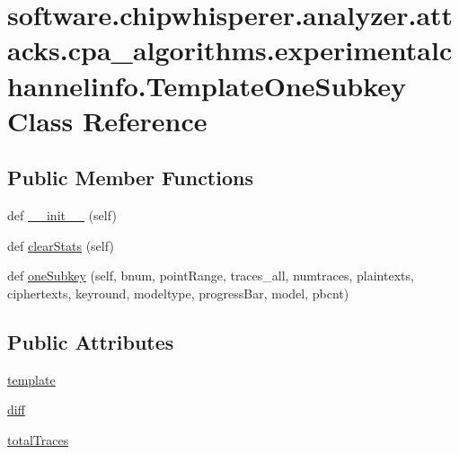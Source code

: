 \hypertarget{classsoftware_1_1chipwhisperer_1_1analyzer_1_1attacks_1_1cpa__algorithms_1_1experimentalchannelinfo_1_1TemplateOneSubkey}{}\section{software.\+chipwhisperer.\+analyzer.\+attacks.\+cpa\+\_\+algorithms.\+experimentalchannelinfo.\+Template\+One\+Subkey Class Reference}
\label{classsoftware_1_1chipwhisperer_1_1analyzer_1_1attacks_1_1cpa__algorithms_1_1experimentalchannelinfo_1_1TemplateOneSubkey}
\subsection*{Public Member Functions}
\begin{DoxyCompactItemize}
\item 
def \hyperlink{classsoftware_1_1chipwhisperer_1_1analyzer_1_1attacks_1_1cpa__algorithms_1_1experimentalchannelinfo_1_1TemplateOneSubkey_a4c291e571b9d3e10c2471c584ebc11d4}{\+\_\+\+\_\+init\+\_\+\+\_\+} (self)
\item 
def \hyperlink{classsoftware_1_1chipwhisperer_1_1analyzer_1_1attacks_1_1cpa__algorithms_1_1experimentalchannelinfo_1_1TemplateOneSubkey_aac361e887f569f9760129d82a70cbea1}{clear\+Stats} (self)
\item 
def \hyperlink{classsoftware_1_1chipwhisperer_1_1analyzer_1_1attacks_1_1cpa__algorithms_1_1experimentalchannelinfo_1_1TemplateOneSubkey_a7277d55c322897cd3b9739b27e4ee30b}{one\+Subkey} (self, bnum, point\+Range, traces\+\_\+all, numtraces, plaintexts, ciphertexts, keyround, modeltype, progress\+Bar, model, pbcnt)
\end{DoxyCompactItemize}
\subsection*{Public Attributes}
\begin{DoxyCompactItemize}
\item 
\hyperlink{classsoftware_1_1chipwhisperer_1_1analyzer_1_1attacks_1_1cpa__algorithms_1_1experimentalchannelinfo_1_1TemplateOneSubkey_a2c99b3cf2d4152c9361ed3661694bcdc}{template}
\item 
\hyperlink{classsoftware_1_1chipwhisperer_1_1analyzer_1_1attacks_1_1cpa__algorithms_1_1experimentalchannelinfo_1_1TemplateOneSubkey_aa0944d2162d0d108ae3c7338acd5cf30}{diff}
\item 
\hyperlink{classsoftware_1_1chipwhisperer_1_1analyzer_1_1attacks_1_1cpa__algorithms_1_1experimentalchannelinfo_1_1TemplateOneSubkey_a761436db7796a3c2118b452fcd74f2fb}{total\+Traces}
\end{DoxyCompactItemize}


